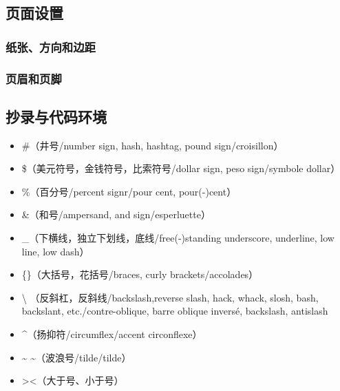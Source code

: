     \subsection{页面设置}
        \subsubsection{纸张、方向和边距}

        \subsubsection{页眉和页脚}

    \subsection{抄录与代码环境}
            \begin{itemize}
                \item \#（井号/number sign, hash, hashtag, pound sign/croisillon）
                \item \$（美元符号，金钱符号，比索符号/dollar sign, peso sign/symbole dollar）
                \item \%（百分号/percent signr/pour cent, pour(-)cent）
                \item \&（和号/ampersand, and sign/esperluette）
                \item \_（下横线，独立下划线，底线/free(-)standing underscore, underline, low line, low dash）
                \item \{\}（大括号，花括号/braces, curly brackets/accolades）
                \item \textbackslash \textrm{} {\rmfamily {}}（反斜杠，反斜线/backslash,reverse slash, hack, whack, slosh, bash, backslant, etc./contre-oblique, barre oblique inversé, backslash, antislash
                \item \^{}（扬抑符/circumflex/accent circonflexe）
                \item \~{} \textasciitilde（波浪号/tilde/tilde）
                \item \textgreater \textless（大于号、小于号）
            \end{itemize}
        
